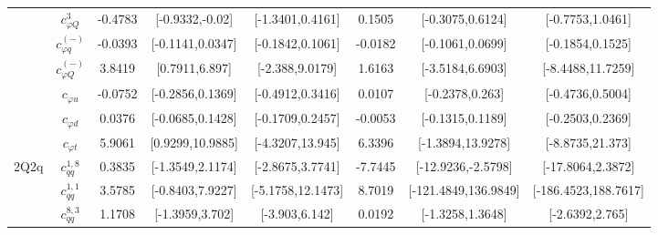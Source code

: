\documentclass{article}
\begin{document}
\begin{table}[H]
\begin{tabular}{|c|c|c|c|c|c|c|c|}
 & $c_{\varphi Q}^{3}$ & -0.4783                             & [-0.9332,-0.02]                                 & [-1.3401,0.4161] & 0.1505                             & [-0.3075,0.6124]                                 & [-0.7753,1.0461] \\ \cline{2-8}
 & $c_{\varphi q}^{(-)}$ & -0.0393                             & [-0.1141,0.0347]                                 & [-0.1842,0.1061] & -0.0182                             & [-0.1061,0.0699]                                 & [-0.1854,0.1525] \\ \cline{2-8}
 & $c_{\varphi Q}^{(-)}$ & 3.8419                             & [0.7911,6.897]                                 & [-2.388,9.0179] & 1.6163                             & [-3.5184,6.6903]                                 & [-8.4488,11.7259] \\ \cline{2-8}
 & $c_{\varphi u}$ & -0.0752                             & [-0.2856,0.1369]                                 & [-0.4912,0.3416] & 0.0107                             & [-0.2378,0.263]                                 & [-0.4736,0.5004] \\ \cline{2-8}
 & $c_{\varphi d}$ & 0.0376                             & [-0.0685,0.1428]                                 & [-0.1709,0.2457] & -0.0053                             & [-0.1315,0.1189]                                 & [-0.2503,0.2369] \\ \cline{2-8}
 & $c_{\varphi t}$ & 5.9061                             & [0.9299,10.9885]                                 & [-4.3207,13.945] & 6.3396                             & [-1.3894,13.9278]                                 & [-8.8735,21.373] \\ \cline{2-8}
\hline
\multirow{14}{*}{2Q2q}
 & $c_{qq}^{1,8}$ & 0.3835                             & [-1.3549,2.1174]                                 & [-2.8675,3.7741] & -7.7445                             & [-12.9236,-2.5798]                                 & [-17.8064,2.3872] \\ \cline{2-8}
 & $c_{qq}^{1,1}$ & 3.5785                             & [-0.8403,7.9227]                                 & [-5.1758,12.1473] & 8.7019                             & [-121.4849,136.9849]                                 & [-186.4523,188.7617] \\ \cline{2-8}
 & $c_{qq}^{8,3}$ & 1.1708                             & [-1.3959,3.702]                                 & [-3.903,6.142] & 0.0192                             & [-1.3258,1.3648]                                 & [-2.6392,2.765] \\ \cline{2-8}

\end{tabular}
\end{table}
\end{document}
